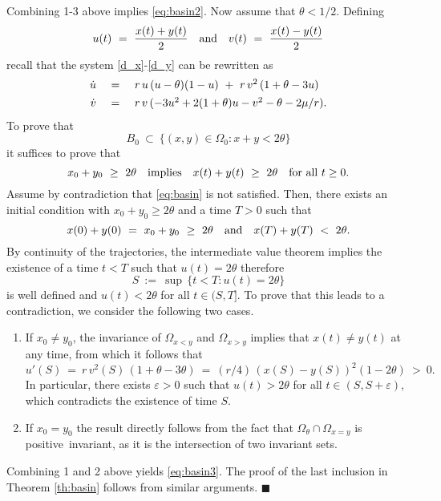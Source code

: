  Combining 1-3 above implies \eqref{eq:basin2}.
 Now assume that $\theta < 1/2$.
 Defining
 $$ u (t) \ = \ \frac{x (t) + y (t)}{2} \quad \hbox{and} \quad v (t) \ = \ \frac{x (t) - y (t)}{2} $$
 recall that the system \eqref{d_x}-\eqref{d_y} can be rewritten as
 $$ \begin{array}{rcl}
    \dot{u} \ & = & \ r \,u \,(u - \theta) (1 - u) \ + \ r \,v^2 \,(1 + \theta - 3u) \vspace{4pt} \\
    \dot{v} \ & = & \ r \,v \,(- 3 u^2 + 2 (1 + \theta) u - v^2 - \theta - 2 \mu / r). \end{array} $$
 To prove that
\begin{equation}
\label{eq:basin3}
 B_0 \ \subset \ \{(x, y) \in \Omega_0 : x + y < 2 \theta \}
\end{equation}
 it suffices to prove that
\begin{equation}
\label{eq:basin}
 x_0 + y_0 \ \geq \ 2 \theta \quad \hbox{implies} \quad x (t) + y (t) \ \geq \ 2 \theta \quad \hbox{for all} \ t \geq 0.
\end{equation}
 Assume by contradiction that \eqref{eq:basin} is not satisfied.
 Then, there exists an initial condition with $x_0 + y_0 \geq 2 \theta$ and a time $T > 0$ such that
 $$ x (0) + y (0) \ = \ x_0 + y_0 \ \geq \ 2 \theta \quad \hbox{and} \quad x (T) + y (T) \ < \ 2 \theta. $$
 By continuity of the trajectories, the intermediate value theorem implies the existence of a time $t < T$ such that $u (t) = 2 \theta$
 therefore
 $$ S \ := \ \sup \,\{t < T : u (t) = 2 \theta \} $$
 is well defined and $u (t) < 2 \theta$ for all $t \in (S, T]$.
 To prove that this leads to a contradiction, we consider the following two cases.
\begin{enumerate}
 \item If $x_0 \neq y_0$, the invariance of $\Omega_{x < y}$ and $\Omega_{x > y}$ implies that $x (t) \neq y (t)$ at any time,
  from which it follows that
  $$ u' (S) \ = \ r \,v^2 (S) \,(1 + \theta - 3 \theta) \ = \ (r / 4) \,(x (S) - y (S))^2 (1 - 2 \theta) \ > \ 0. $$
 In particular, there exists ${\mbox{$\varepsilon$}} > 0$ such that $u (t) > 2 \theta$ for all $t \in (S, S + {\mbox{$\varepsilon$}})$, which contradicts the
 existence of time $S$. \vspace{4pt}
\item If $x_0 = y_0$ the result directly follows from the fact that $\Omega_{\theta} \cap \Omega_{x = y}$ is
 positive~invariant, as it is the intersection of two invariant sets.
\end{enumerate}
 Combining 1 and 2 above yields \eqref{eq:basin3}.
 The proof of the last inclusion in Theorem \ref{th:basin} follows from similar arguments. \hspace{2mm} $\blacksquare$

